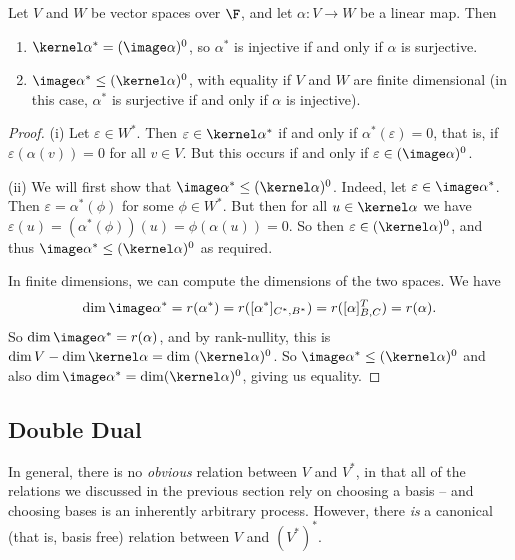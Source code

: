 \documentclass[a4paper]{scrartcl}
\begin{document}
\begin{proposition}
    Let $V$ and $W$ be vector spaces over $\F$, and let $\alpha: V \rightarrow W$ be a linear map. Then
    \begin{enumerate}[label=(\roman*)]
        \item $\kernel \alpha^* = (\image \alpha)^0$, so $\alpha^*$ is injective if and only if $\alpha$ is surjective.
        \item $\image \alpha^* \leq (\kernel \alpha)^0$, with equality if $V$ and $W$ are finite dimensional (in this case, $\alpha^*$ is surjective if and only if $\alpha$ is injective).
    \end{enumerate}
\end{proposition}
\begin{proof}
    (i) Let $\varepsilon \in W^*$. Then $\varepsilon \in \kernel \alpha^*$ if and only if $\alpha^*(\varepsilon) = 0$, that is, if $\varepsilon(\alpha(v)) = 0$ for all $v \in V$. But this occurs if and only if $\varepsilon \in (\image \alpha)^0$.

    (ii) We will first show that $\image \alpha^* \leq (\kernel \alpha)^0$. Indeed, let $\varepsilon \in \image \alpha^*$. Then $\varepsilon = \alpha^*(\phi)$ for some $\phi \in W^*$. But then for all $u \in \kernel \alpha$ we have $\varepsilon (u) = (\alpha^*(\phi))(u) = \phi(\alpha(u)) = 0$. So then $\varepsilon \in (\kernel \alpha)^0$, and thus $\image \alpha^* \leq (\kernel \alpha)^0$ as required. 

    In finite dimensions, we can compute the dimensions of the two spaces. We have
    $$
    \dim \image \alpha^* = r(\alpha^*) = r([\alpha^*]_{C^*, B^*}) = r([\alpha]^T_{B, C}) = r(\alpha).
    $$
    So $\dim \image \alpha^* = r(\alpha)$, and by rank-nullity, this is $\dim V - \dim \kernel \alpha = \dim \; (\kernel \alpha)^0$. So $\image \alpha^* \leq (\kernel \alpha)^0$ and also $\dim \image \alpha^* = \dim (\kernel \alpha)^0$,  giving us equality.
\end{proof}

\subsection{Double Dual}

In general, there is no \emph{obvious} relation between $V$ and $V^*$, in that all of the relations we discussed in the previous section rely on choosing a basis -- and choosing bases is an inherently arbitrary process. However, there \emph{is} a canonical (that is, basis free) relation between $V$ and $(V^*)^*$.
\end{document}
